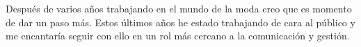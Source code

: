 

\begin{cvparagraph}

Después de varios años trabajando en el mundo de la moda creo que es momento de dar un paso más. Estos últimos años he estado trabajando de cara al público y me encantaría seguir con ello en un rol más cercano a la comunicación y gestión.
\end{cvparagraph}
